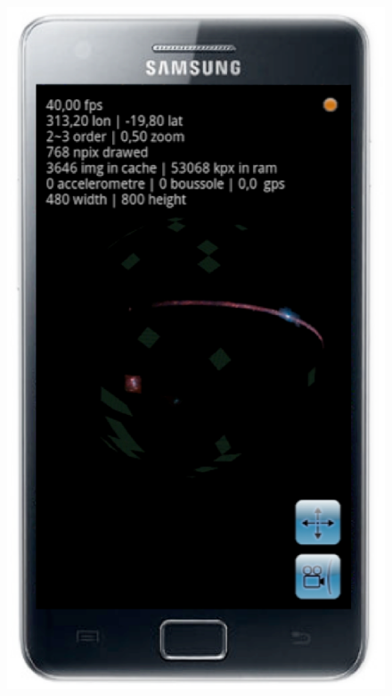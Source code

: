 \begin{figure}[ht] \center
\includegraphics[scale=0.28]{part5/Schaaff_O28/O28_f1.eps}

\end{figure}
